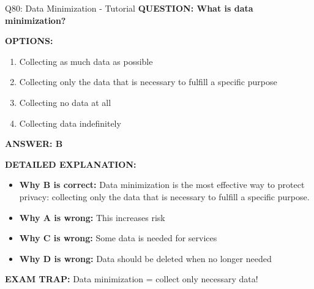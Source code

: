 \documentclass[8pt]{beamer}
\begin{document}
	\begin{frame}{Q80: Data Minimization - Tutorial}
		\fontsize{6.5}{7.5}\selectfont
		\textbf{QUESTION: What is data minimization?}
		
		\vspace{0.1cm}
		\textbf{OPTIONS:}
		\begin{enumerate}
			\item Collecting as much data as possible
			\item Collecting only the data that is necessary to fulfill a specific purpose
			\item Collecting no data at all
			\item Collecting data indefinitely
		\end{enumerate}
		
		\vspace{0.1cm}
		\textcolor{myblue}{\textbf{ANSWER: B}}
		
		\vspace{0.1cm}
		\textbf{DETAILED EXPLANATION:}
		\begin{itemize}
			\item \textbf{Why B is correct:} Data minimization is the most effective way to protect privacy: collecting only the data that is necessary to fulfill a specific purpose.
			\item \textbf{Why A is wrong:} This increases risk
			\item \textbf{Why C is wrong:} Some data is needed for services
			\item \textbf{Why D is wrong:} Data should be deleted when no longer needed
		\end{itemize}
		
		\textcolor{myred}{\textbf{EXAM TRAP:}} Data minimization = \textcolor{myblue}{collect only necessary data}!
	\end{frame}
	
\end{document}
